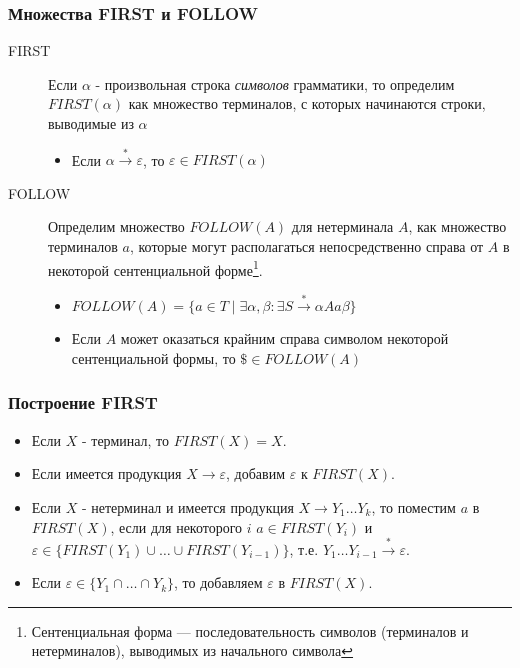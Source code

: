 \documentclass[16pt,pdf,unicode]{beamer}
\begin{document}
\begin{frame}
\frametitle{Множества FIRST и FOLLOW}
\begin{description}
  \item[FIRST] Если $\alpha$ - произвольная строка \textit{символов} грамматики, то определим $FIRST(\alpha)$ как множество терминалов, с которых начинаются строки, выводимые из $\alpha$ 
    \begin{itemize}
      \item Если $\alpha \xrightarrow{*} \varepsilon$, то  $\varepsilon \in FIRST(\alpha)$
    \end{itemize}
  \item[FOLLOW] Определим множество $FOLLOW(A)$ для нетерминала $A$, как множество терминалов $a$, которые могут располагаться непосредственно справа от $A$ в некоторой сентенциальной форме\footnote{Сентенциальная форма — последовательность символов (терминалов и нетерминалов), выводимых из начального символа}.
    \begin{itemize}
      \item $FOLLOW(A) = \{a \in T \mid \exists \alpha,\beta : \exists S \xrightarrow{*} \alpha A a \beta\}$
      \item Если $A$ может оказаться крайним справа символом некоторой сентенциальной формы, то $\$ \in FOLLOW(A)$
    \end{itemize}
\end{description}
\end{frame}

\begin{frame}
\frametitle{Построение FIRST}
\begin{itemize}
  \item Если $X$ - терминал, то $FIRST(X)={X}$.
  \item Если имеется продукция $X \rightarrow \varepsilon$, добавим $\varepsilon$ к $FIRST(X)$.
  \item Если $X$ - нетерминал и имеется продукция $X \rightarrow Y_1\dots Y_k$, то поместим $a$ в $FIRST(X)$, если для некоторого $i$ $a \in FIRST(Y_i)$ и $\varepsilon \in \{FIRST(Y_1) \cup \dots \cup FIRST(Y_{i-1})\}$, т.е. $Y_1\dots Y_{i-1} \xrightarrow{*} \varepsilon$. 
  \item Если $\varepsilon \in \{Y_1\cap\dots\cap Y_k\} $, то добавляем $\varepsilon$ в $FIRST(X)$.
\end{itemize}
\end{frame}
\end{document}
